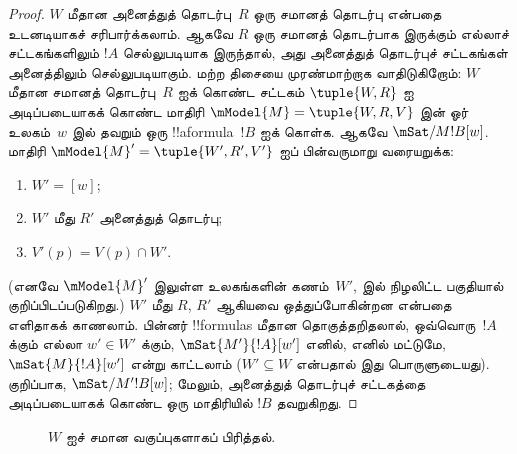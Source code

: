 \documentclass[../../../include/open-logic-section]{subfiles}
\begin{document}
\begin{proof}
  $W$ மீதான அனைத்துத் தொடர்பு~$R$ ஒரு சமானத் தொடர்பு என்பதை உடனடியாகச்
  சரிபார்க்கலாம். ஆகவே $R$ ஒரு சமானத் தொடர்பாக இருக்கும் எல்லாச்
  சட்டகங்களிலும் $!A$ செல்லுபடியாக இருந்தால், அது அனைத்துத் தொடர்புச்
  சட்டகங்கள் அனைத்திலும் செல்லுபடியாகும். மற்ற திசையை முரண்மாற்றாக
  வாதிடுகிறோம்: $W$ மீதான சமானத் தொடர்பு~$R$ ஐக் கொண்ட சட்டகம்
  $\tuple{W,R}$ ஐ அடிப்படையாகக் கொண்ட மாதிரி $\mModel{M} = \tuple{W,
  R, V}$ இன் ஓர் உலகம்~$w$ இல் தவறும் ஒரு !!a{formula}~$!B$ ஐக் கொள்க.
  ஆகவே $\mSat/{M}{!B}[w]$. மாதிரி $\mModel{M}' = \tuple{W', R', V'}$ ஐப்
  பின்வருமாறு வரையறுக்க:
  \begin{enumerate}
  \item $W' = [w]$;
  \item $W'$ மீது $R'$ அனைத்துத் தொடர்பு;
  \item $V'(p) = V(p) \cap W'$.
  \end{enumerate}
  (எனவே $\mModel{M}'$ இலுள்ள உலகங்களின் கணம்~$W'$, 
  இல் நிழலிட்ட பகுதியால் குறிப்பிடப்படுகிறது.) $W'$ மீது $R$, $R'$ ஆகியவை
  ஒத்துப்போகின்றன என்பதை எளிதாகக் காணலாம். பின்னர் !!{formula}s மீதான
  தொகுத்தறிதலால், ஒவ்வொரு~$!A$ க்கும் எல்லா $w' \in W'$ க்கும்,
  $\mSat{M'}{!A}[w']$ எனில், எனில் மட்டுமே, $\mSat{M}{!A}[w']$ என்று
  காட்டலாம் ($W' \subseteq W$ என்பதால் இது பொருளுடையது). குறிப்பாக,
  $\mSat/{M'}{!B}[w]$; மேலும், அனைத்துத் தொடர்புச் சட்டகத்தை அடிப்படையாகக்
  கொண்ட ஒரு மாதிரியில் $!B$ தவறுகிறது.
\end{proof}

\begin{figure}[t]
  \centering
  \caption{$W$ ஐச் சமான வகுப்புகளாகப் பிரித்தல்.}
\end{figure}
\end{document}

